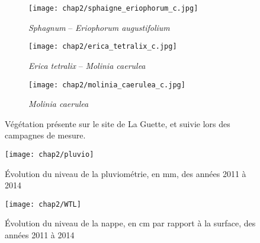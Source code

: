 \begin{figure}[htbp]
    \centering
    \begin{subfigure}[b]{.98\textwidth} %
        \centering \texttt{[image: chap2/sphaigne\_eriophorum\_c.jpg]}
        \caption{\textit{Sphagnum} -- \textit{Eriophorum augustifolium}}\label{fig:sphg_erio}
    \end{subfigure}
    
    \begin{subfigure}[b]{0.49\textwidth}
        \centering \texttt{[image: chap2/erica\_tetralix\_c.jpg]}
        \caption{\textit{Erica tetralix} -- \textit{Molinia caerulea}}\label{fig:erica}
    \end{subfigure}
    \begin{subfigure}[b]{0.49\textwidth}
        \centering \texttt{[image: chap2/molinia\_caerulea\_c.jpg]}
        \caption{\textit{Molinia caerulea}}\label{fig:mol}
    \end{subfigure}

    \caption{Végétation présente sur le site de La Guette, et suivie lors des campagnes de mesure.}\label{fig:veg}
\end{figure}


\begin{figure}
\centering
\texttt{[image: chap2/pluvio]}
\caption{Évolution du niveau de la pluviométrie, en \si{\mm}, des années 2011 à 2014}
\label{fig:pluvio}
\end{figure}

\begin{figure}
\centering
\texttt{[image: chap2/WTL]}
\caption{Évolution du niveau de la nappe, en cm par rapport à la surface, des années 2011 à 2014}
\label{fig:WTL}
\end{figure}

